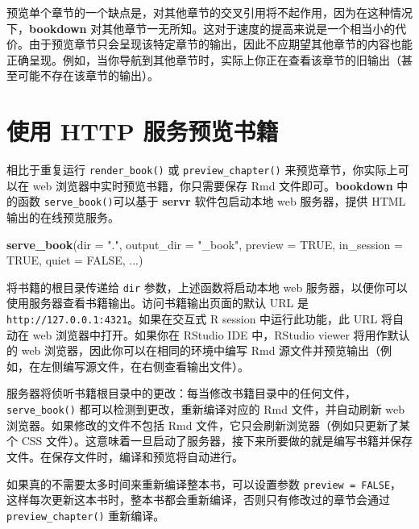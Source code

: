 \documentclass[
  12pt,
]{krantz}
\newenvironment{Shaded}{\begin{snugshade}}{\end{snugshade}}
\newcommand{\AttributeTok}[1]{\textcolor[rgb]{0.13,0.29,0.53}{#1}}
\newcommand{\ConstantTok}[1]{\textcolor[rgb]{0.56,0.35,0.01}{#1}}
\newcommand{\FunctionTok}[1]{\textcolor[rgb]{0.13,0.29,0.53}{\textbf{#1}}}
\newcommand{\NormalTok}[1]{#1}
\newcommand{\StringTok}[1]{\textcolor[rgb]{0.31,0.60,0.02}{#1}}
\theoremstyle{definition}
\theoremstyle{definition}
\theoremstyle{definition}
\theoremstyle{definition}
\theoremstyle{remark}
\begin{document}
预览单个章节的一个缺点是，对其他章节的交叉引用将不起作用，因为在这种情况下，\textbf{bookdown} 对其他章节一无所知。这对于速度的提高来说是一个相当小的代价。由于预览章节只会呈现该特定章节的输出，因此不应期望其他章节的内容也能正确呈现。例如，当你导航到其他章节时，实际上你正在查看该章节的旧输出（甚至可能不存在该章节的输出）。

\section{使用 HTTP 服务预览书籍}\label{ux4f7fux7528-http-ux670dux52a1ux9884ux89c8ux4e66ux7c4d}

相比于重复运行 \texttt{render\_book()} 或 \texttt{preview\_chapter()} 来预览章节，你实际上可以在 web 浏览器中实时预览书籍，你只需要保存 Rmd 文件即可。\textbf{bookdown} 中的函数 \texttt{serve\_book()}可以基于 \textbf{servr} 软件包\citep{R-servr}启动本地 web 服务器，提供 HTML 输出的在线预览服务。

\begin{Shaded}
\begin{Highlighting}[]
\FunctionTok{serve\_book}\NormalTok{(}\AttributeTok{dir =} \StringTok{"."}\NormalTok{, }\AttributeTok{output\_dir =} \StringTok{"\_book"}\NormalTok{,}
  \AttributeTok{preview =} \ConstantTok{TRUE}\NormalTok{, }\AttributeTok{in\_session =} \ConstantTok{TRUE}\NormalTok{, }\AttributeTok{quiet =} \ConstantTok{FALSE}\NormalTok{,}
\NormalTok{  ...)}
\end{Highlighting}
\end{Shaded}

将书籍的根目录传递给 \texttt{dir} 参数，上述函数将启动本地 web 服务器，以便你可以使用服务器查看书籍输出。访问书籍输出页面的默认 URL 是 \texttt{http://127.0.0.1:4321}。如果在交互式 R session 中运行此功能，此 URL 将自动在 web 浏览器中打开。如果你在 RStudio IDE 中，RStudio viewer 将用作默认的 web 浏览器，因此你可以在相同的环境中编写 Rmd 源文件并预览输出（例如，在左侧编写源文件，在右侧查看输出文件）。

服务器将侦听书籍根目录中的更改：每当修改书籍目录中的任何文件，\texttt{serve\_book()} 都可以检测到更改，重新编译对应的 Rmd 文件，并自动刷新 web 浏览器。如果修改的文件不包括 Rmd 文件，它只会刷新浏览器（例如只更新了某个 CSS 文件）。这意味着一旦启动了服务器，接下来所要做的就是编写书籍并保存文件。在保存文件时，编译和预览将自动进行。

如果真的不需要太多时间来重新编译整本书，可以设置参数 \texttt{preview\ =\ FALSE}，这样每次更新这本书时，整本书都会重新编译，否则只有修改过的章节会通过 \texttt{preview\_chapter()} 重新编译。
\end{document}
